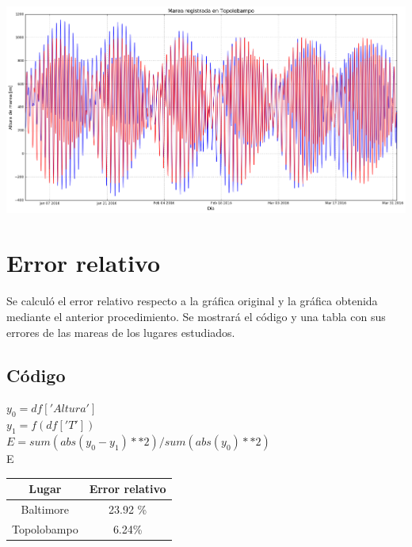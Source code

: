 \documentclass[a4paper,12pt]{article}
\begin{document}
\begin{center}
\includegraphics[scale=0.4]{graficatopo7.png}
\end{center}
\section{Error relativo}
\noindent
Se calculó el error relativo respecto a la gráfica original y la gráfica obtenida mediante el anterior procedimiento. Se mostrará el código y una tabla con sus errores de las mareas de los lugares estudiados.
\subsection{Código}
\noindent
$y_0 = df['Altura']$\\
$y_1 = f(df['T'])$\\
\noindent
$E= sum(abs(y_0-y_1)**2) / sum(abs(y_0)**2)$\\
E

\centering
\begin{tabular}{|c|c|}
\hline
Lugar & Error relativo \\ \hline
Baltimore & 23.92 \% \\ \hline
Topolobampo & 6.24\% \\ \hline
\end{tabular}
\end{document}
